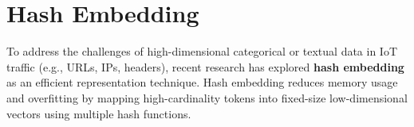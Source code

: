 \begin{ZhChapter}
    \begin{table*}[htbp]
        \centering
        \caption{Examples of Field-Value Tokenization in IoT Network Traffic}
        \label{tab:tokenization_examples}
    \end{table*}



    \section{Hash Embedding} \label{sec:hash_embedding}
    To address the challenges of high-dimensional categorical or textual data in IoT traffic (e.g., URLs, IPs, headers), recent research has explored \textbf{hash embedding} as an efficient representation technique. Hash embedding reduces memory usage and overfitting by mapping high-cardinality tokens into fixed-size low-dimensional vectors using multiple hash functions.


\end{ZhChapter}
